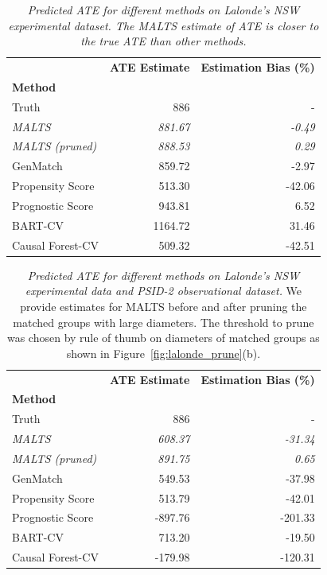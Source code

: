 \begin{table}
 \caption{{\it Predicted ATE for different methods on Lalonde's NSW experimental dataset. The MALTS estimate of ATE is closer to the true ATE than other methods.}}
 \label{tab:lalonde}
 \centering
\begin{tabular}{lrr}
\hline
{} &  \textbf{ATE Estimate} &  \textbf{Estimation Bias (\%)} \\
\textbf{Method}           &               &                      \\
\hline
Truth         &    886 &            - \\
\textit{MALTS}            &    \textit{881.67} &            \textit{-0.49} \\
\textit{MALTS  (pruned)}            &    \textit{888.53} &            \textit{0.29} \\
GenMatch         &    859.72 &            -2.97 \\
Propensity Score &    513.30 &           -42.06 \\
Prognostic Score &    943.81 &             6.52 \\
BART-CV          &   1164.72 &            31.46 \\
Causal Forest-CV &    509.32 &           -42.51 \\
\hline
\end{tabular}
\end{table}

\begin{table}
 \caption{{\it Predicted ATE for different methods on Lalonde's NSW experimental data and PSID-2 observational dataset.} We provide estimates for MALTS before and after pruning the matched groups with large diameters. The threshold to prune was chosen by rule of thumb on diameters of matched groups as shown in Figure~\ref{fig:lalonde_prune}(b).}
 \label{tab:lalonde_psid2}
 \centering
\begin{tabular}{lrr}
\hline
{} &  \textbf{ATE Estimate} &  \textbf{Estimation Bias (\%)} \\
\textbf{Method}          &               &                      \\
\hline
Truth         &    886 &            - \\
\textit{MALTS}            &    \textit{608.37} &             \textit{-31.34} \\
\textit{MALTS (pruned)}            &    \textit{891.75} &             \textit{0.65} \\
GenMatch         &    549.53 &           -37.98 \\
Propensity Score &    513.79 &           -42.01 \\
Prognostic Score &   -897.76 &          -201.33 \\
BART-CV          &    713.20 &           -19.50 \\
Causal Forest-CV &   -179.98 &          -120.31 \\
\hline
\end{tabular}
\end{table}

